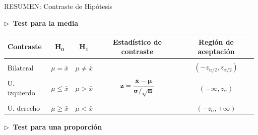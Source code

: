 \begin{myblock}{RESUMEN: Contraste de Hipótesis}

$\triangleright\ $ \textbf{Test para la media}

\begin{table}[H]
\begin{tabular}{l|c|c|c|c}
\textbf{Contraste} & $\boldsymbol{H_0}$    & $\boldsymbol{H_1}$    & \textbf{Estadístico de contraste}                                         & \textbf{Región de aceptación}  \\ \hline
                   & \multicolumn{1}{l|}{} & \multicolumn{1}{l|}{} & \multicolumn{1}{l|}{}                                                     & \multicolumn{1}{l}{}           \\
Bilateral          & $\mu = \bar x$        & $\mu \neq \bar x$     & \multirow{5}{*}{$\boldsymbol{z=\dfrac{\bar x - \mu}{\sigma / \sqrt{n}}}$} & $(-z_{\alpha/2},z_{\alpha/2})$ \\ \cline{1-3} \cline{5-5} 
                   & \multicolumn{1}{l|}{} & \multicolumn{1}{l|}{} &                                                                           &                                \\
U. izquierdo       & $\mu \le \bar x$      & $\mu > \bar x$        &                                                                           & $(-\infty,z_\alpha)$           \\ \cline{1-3} \cline{5-5} 
                   & \multicolumn{1}{l|}{} & \multicolumn{1}{l|}{} &                                                                           &                                \\
U. derecho         & $\mu \ge \bar x$      & $\mu < \bar x$        &                                                                           & $(-z_\alpha,+\infty)$          \\ \hline
\end{tabular}
\end{table}

\vspace{1cm}

$\triangleright\ $ \textbf{Test para una proporción}


\end{myblock}

